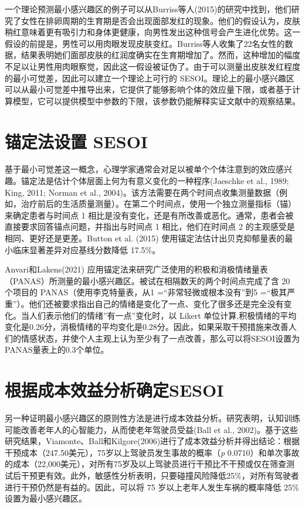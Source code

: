\documentclass[
  letterpaper,
  DIV=11,
  numbers=noendperiod]{scrreprt}
\begin{document}
一个理论预测最小感兴趣区的例子可以从Burriss等人(2015)的研究中找到，他们研究了女性在排卵周期的生育期是否会出现面部发红的现象。他们的假设认为，皮肤稍红意味着更有吸引力和身体更健康，向男性发出这种信号会产生进化优势。这一假设的前提是，男性可以用肉眼发现皮肤变红。Burriss等人收集了22名女性的数据，结果表明她们面部皮肤的红润度确实在生育期增加了。然而，这种增加的幅度不足以让男性用肉眼察觉，因此这一假设被证伪了。由于可以测量出皮肤发红程度的最小可觉差，因此可以建立一个理论上可行的
SESOI。理论上的最小感兴趣区可以从最小可觉差中推导出来，它提供了能够影响个体的效应量下限，或者基于计算模型，它可以提供模型中参数的下限，该参数仍能解释实证文献中的观察结果。

\hypertarget{ux951aux5b9aux6cd5ux8bbeux7f6e-sesoi}{%
\section{锚定法设置 SESOI}\label{ux951aux5b9aux6cd5ux8bbeux7f6e-sesoi}}

基于最小可觉差这一概念，心理学家通常会对足以被单个个体注意到的效应感兴趣。锚定法是估计个体层面上何为有意义变化的一种程序(Jaeschke
et al., 1989; King, 2011; Norman et al.,
2004)。该方法需要在两个时间点收集测量数据（例如，治疗前后的生活质量测量）。在第二个时间点，使用一个独立测量指标（锚）来确定患者与时间点
1
相比是没有变化，还是有所改善或恶化。通常，患者会被直接要求回答锚点问题，并指出与时间点
1 相比，他们在时间点 2 的主观感受是相同、更好还是更差。Button et al.
(2015) 使用锚定法估计出贝克抑郁量表的最小临床显著差异对应基线分数降低
17.5\%。

Anvari和Lakens(2021)
应用锚定法来研究广泛使用的积极和消极情绪量表（PANAS）所测量的最小感兴趣区。被试在相隔数天的两个时间点完成了含
20 个项目的 PANAS（使用李克特量表，从1 =``非常轻微或根本没有''到5
=``极其严重''）。他们还被要求指出自己的情绪是变化了一点、变化了很多还是完全没有变化。当人们表示他们的情绪''有一点''变化时，以
Likert
单位计算,积极情绪的平均变化是0.26分，消极情绪的平均变化是0.28分。因此，如果采取干预措施来改善人们的情感状态，并使个人主观上认为至少有了一点改善，那么可以将SESOI设置为PANAS量表上的0.3个单位。

\hypertarget{ux6839ux636eux6210ux672cux6548ux76caux5206ux6790ux786eux5b9asesoi}{%
\section{根据成本效益分析确定SESOI}\label{ux6839ux636eux6210ux672cux6548ux76caux5206ux6790ux786eux5b9asesoi}}

另一种证明最小感兴趣区的原则性方法是进行成本效益分析。研究表明，认知训练可能改善老年人的心智能力，从而使老年驾驶员受益(Ball
et al.,
2002)。基于这些研究结果，Viamonte、Ball和Kilgore(2006)进行了成本效益分析并得出结论：根据干预成本（247.50美元），75岁以上驾驶员发生事故的概率（\emph{p}
0.0710）和单次事故的成本（22,000美元），对所有75岁及以上驾驶员进行干预比不干预或仅在筛查测试后干预更有效。此外，敏感性分析表明，只要碰撞风险降低25\%，对所有驾驶者进行干预仍然是有益的。因此，可以将
75 岁以上老年人发生车祸的概率降低 25\% 设置为最小感兴趣区。
\end{document}
